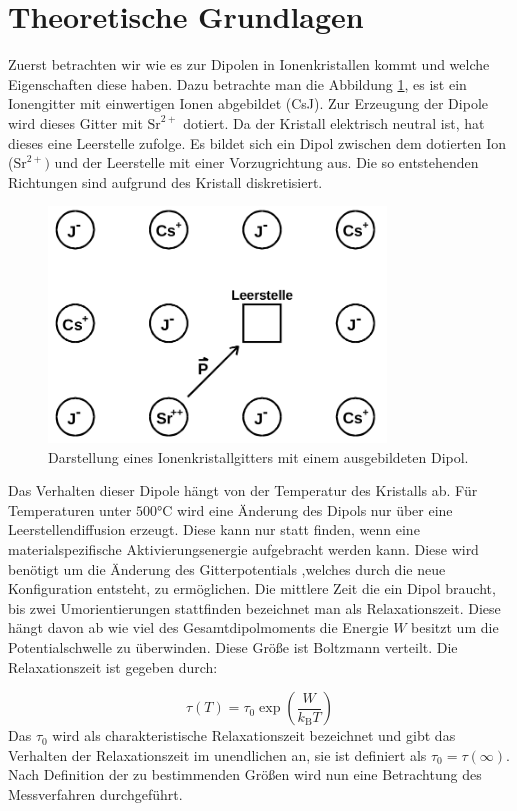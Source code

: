 \section{Theoretische Grundlagen}
\label{sec:Theorie}
Zuerst betrachten wir wie es zur Dipolen in Ionenkristallen kommt und welche
Eigenschaften diese haben. Dazu betrachte man die Abbildung \ref{theo1}, es ist
ein Ionengitter mit einwertigen Ionen abgebildet (CsJ). Zur Erzeugung
der Dipole wird dieses Gitter mit $\text{Sr}^{2+}$ dotiert. Da der Kristall
elektrisch neutral ist, hat dieses eine Leerstelle zufolge. Es bildet
sich ein Dipol zwischen dem dotierten Ion ($\text{Sr}^{2+})$ und der Leerstelle
mit einer Vorzugrichtung aus. Die so entstehenden Richtungen sind aufgrund
des Kristall diskretisiert.
\begin{figure}
\centering
\includegraphics[width=0.8\textwidth]{ressources/ionengitter.png}
\caption{Darstellung eines Ionenkristallgitters mit einem ausgebildeten Dipol. \cite{skript}}
\label{theo1}
\end{figure}
Das Verhalten dieser Dipole hängt von der Temperatur des Kristalls ab. Für
Temperaturen unter $500°$C wird eine Änderung des Dipols nur über eine
Leerstellendiffusion erzeugt.
Diese kann nur statt finden, wenn eine materialspezifische Aktivierungsenergie
aufgebracht werden kann. Diese wird benötigt um die Änderung des Gitterpotentials
,welches durch die neue Konfiguration entsteht, zu ermöglichen. Die mittlere
Zeit die ein Dipol braucht, bis zwei Umorientierungen stattfinden bezeichnet man
als Relaxationszeit. Diese hängt davon ab wie viel des Gesamtdipolmoments die Energie
$W$ besitzt um die Potentialschwelle zu überwinden. Diese Größe ist
Boltzmann verteilt. Die Relaxationszeit ist gegeben durch:


\begin{equation}
    \label{Formel1}
\tau(T)=\tau_0 \exp(\frac{W}{k_\text{B}T})
\end{equation}
Das $\tau_0$ wird als charakteristische Relaxationszeit bezeichnet und
gibt das Verhalten der Relaxationszeit im unendlichen an, sie ist
definiert als $\tau_0=\tau(\infty)$. Nach Definition der zu bestimmenden
Größen wird nun eine Betrachtung des Messverfahren durchgeführt.
